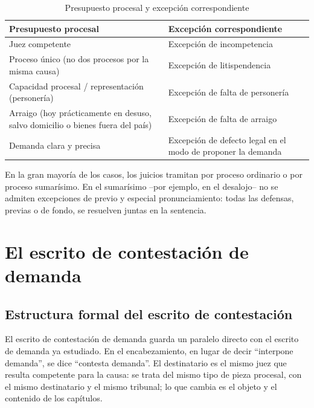 \documentclass[12pt,oneside]{book}
\begin{document}
\begin{table}[H]
\centering
\caption{Presupuesto procesal y excepción correspondiente}
\begin{tabularx}{\textwidth}{>{\raggedright\arraybackslash}X >{\raggedright\arraybackslash}X}
\toprule
\textbf{Presupuesto procesal} & \textbf{Excepción correspondiente} \\
\midrule
Juez competente & Excepción de incompetencia \\
Proceso único (no dos procesos por la misma causa) & Excepción de litispendencia \\
Capacidad procesal / representación (personería) & Excepción de falta de personería \\
Arraigo (hoy prácticamente en desuso, salvo domicilio o bienes fuera del país) & Excepción de falta de arraigo \\
Demanda clara y precisa & Excepción de defecto legal en el modo de proponer la demanda \\
\bottomrule
\end{tabularx}
\end{table}

\begin{important}
En la gran mayoría de los casos, los juicios tramitan por proceso ordinario o por proceso sumarísimo. En el sumarísimo --por ejemplo, en el desalojo-- no se admiten excepciones de previo y especial pronunciamiento: todas las defensas, previas o de fondo, se resuelven juntas en la sentencia.
\end{important}

\chapter{El escrito de contestación de demanda}

\section{Estructura formal del escrito de contestación}

El escrito de contestación de demanda guarda un paralelo directo con el escrito de demanda ya estudiado. En el encabezamiento, en lugar de decir ``interpone demanda'', se dice ``contesta demanda''. El destinatario es el mismo juez que resulta competente para la causa: se trata del mismo tipo de pieza procesal, con el mismo destinatario y el mismo tribunal; lo que cambia es el objeto y el contenido de los capítulos.
\end{document}
